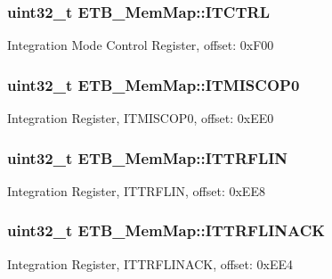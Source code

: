 \subsubsection[{I\+T\+C\+T\+R\+L}]{\setlength{\rightskip}{0pt plus 5cm}uint32\+\_\+t E\+T\+B\+\_\+\+Mem\+Map\+::\+I\+T\+C\+T\+R\+L}\label{struct_e_t_b___mem_map_acf9a92d3db15cc318551da316524d21b}
Integration Mode Control Register, offset\+: 0x\+F00 \hypertarget{struct_e_t_b___mem_map_acdc0e8395d63098ffbbaa63cc05ceb7e}{}
\subsubsection[{I\+T\+M\+I\+S\+C\+O\+P0}]{\setlength{\rightskip}{0pt plus 5cm}uint32\+\_\+t E\+T\+B\+\_\+\+Mem\+Map\+::\+I\+T\+M\+I\+S\+C\+O\+P0}\label{struct_e_t_b___mem_map_acdc0e8395d63098ffbbaa63cc05ceb7e}
Integration Register, I\+T\+M\+I\+S\+C\+O\+P0, offset\+: 0x\+E\+E0 \hypertarget{struct_e_t_b___mem_map_a15ffb02eb23af7c4ee5a13922f3f5d37}{}
\subsubsection[{I\+T\+T\+R\+F\+L\+I\+N}]{\setlength{\rightskip}{0pt plus 5cm}uint32\+\_\+t E\+T\+B\+\_\+\+Mem\+Map\+::\+I\+T\+T\+R\+F\+L\+I\+N}\label{struct_e_t_b___mem_map_a15ffb02eb23af7c4ee5a13922f3f5d37}
Integration Register, I\+T\+T\+R\+F\+L\+I\+N, offset\+: 0x\+E\+E8 \hypertarget{struct_e_t_b___mem_map_a136987669379af39a12062922fee39b1}{}
\subsubsection[{I\+T\+T\+R\+F\+L\+I\+N\+A\+C\+K}]{\setlength{\rightskip}{0pt plus 5cm}uint32\+\_\+t E\+T\+B\+\_\+\+Mem\+Map\+::\+I\+T\+T\+R\+F\+L\+I\+N\+A\+C\+K}\label{struct_e_t_b___mem_map_a136987669379af39a12062922fee39b1}
Integration Register, I\+T\+T\+R\+F\+L\+I\+N\+A\+C\+K, offset\+: 0x\+E\+E4 \hypertarget{struct_e_t_b___mem_map_ae5221e565fed13a5f544c207c5f18843}{}

